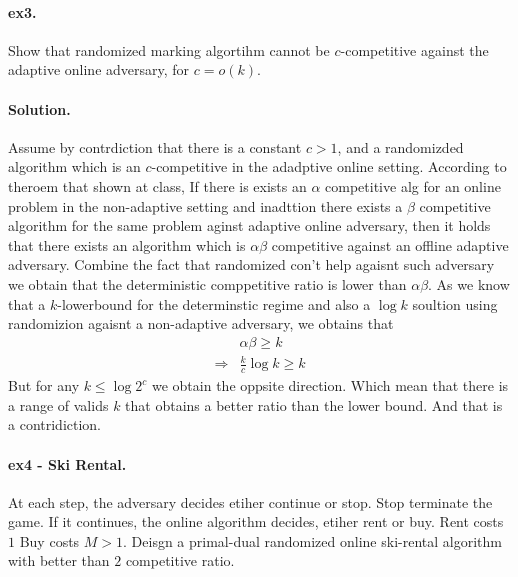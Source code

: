 \documentclass{article}
\begin{document}
\begin{multicols*}{2}
  \paragraph{ex3.} Show that randomized marking algortihm cannot be $c$-competitive against the adaptive online adversary, for $c=o\left( k \right)$. 
  \paragraph{Solution.} Assume by contrdiction that there is a constant $c> 1$, and a randomizded algorithm which is an $c$-competitive in the adadptive online setting. According to theroem that shown at class, If there is exists an $\alpha$ competitive alg for an online problem in the non-adaptive setting and inadttion there exists a $\beta$ competitive algorithm for the same problem aginst adaptive online adversary, then it holds that there exists an algorithm which is $\alpha\beta$ competitive against an offline adaptive adversary. 
  Combine the fact that randomized con't help agaisnt such adversary we obtain that the deterministic comppetitive ratio is lower than $\alpha\beta$. As we know that a $k$-lowerbound for the determinstic regime and also a $\log k$ soultion using randomizion agaisnt a non-adaptive adversary, we obtains that      
  \begin{equation*}
    \begin{split}
      & \alpha\beta \ge k \\ 
      \Rightarrow  & \frac{k}{c}\log k \ge k 
    \end{split}
  \end{equation*} But for any $ k \le \log 2^{c} $ we obtain the oppsite direction. Which mean that there is a range of valids $k$ that obtains a better ratio than the lower bound. And that is a contridiction.   

  \paragraph{ex4 - Ski Rental.} At each step, the adversary decides etiher continue or stop. Stop terminate the game. If it continues, the online algorithm decides, etiher rent or buy. Rent costs $1$ Buy costs $M > 1$. Deisgn a primal-dual randomized online ski-rental algorithm with better than $2$ competitive ratio.  

\end{multicols*}
\end{document}
